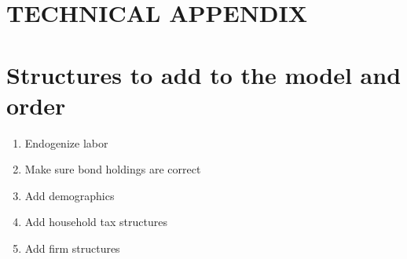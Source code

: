 \documentclass[letterpaper,12pt]{article}
\theoremstyle{definition}
\begin{document}


\newpage




\newpage
\renewcommand{\theequation}{T.\arabic{section}.\arabic{equation}}
\renewcommand{\thesection}{T-\arabic{section}}   %
\setcounter{equation}{0}                         %
\setcounter{section}{0}                          %
\section*{TECHNICAL APPENDIX}


\section{Structures to add to the model and order}\label{TAppSteps}

  \begin{enumerate}
    \item Endogenize labor
    \item Make sure bond holdings are correct
    \item Add demographics
    \item Add household tax structures
    \item Add firm structures
  \end{enumerate}
\end{document}

